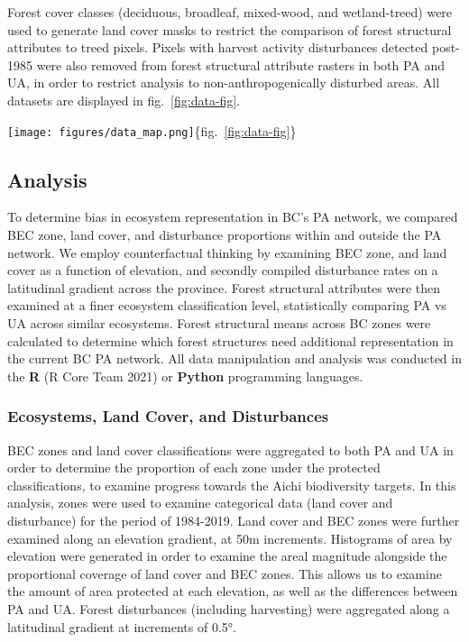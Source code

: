 \documentclass[11pt]{article}
\begin{document}
Forest cover classes (deciduous, broadleaf, mixed-wood, and
wetland-treed) were used to generate land cover masks to restrict the
comparison of forest structural attributes to treed pixels. Pixels with
harvest activity disturbances detected post-1985 were also removed from
forest structural attribute rasters in both PA and UA, in order to
restrict analysis to non-anthropogenically disturbed areas. All datasets
are displayed in fig.~\ref{fig:data-fig}.

\texttt{[image: figures/data\_map.png]}\{fig.~\ref{fig:data-fig}\}

\hypertarget{analysis}{%
\subsection{Analysis}\label{analysis}}

To determine bias in ecosystem representation in BC's PA network, we
compared BEC zone, land cover, and disturbance proportions within and
outside the PA network. We employ counterfactual thinking by examining
BEC zone, and land cover as a function of elevation, and secondly
compiled disturbance rates on a latitudinal gradient across the
province. Forest structural attributes were then examined at a finer
ecosystem classification level, statistically comparing PA vs UA across
similar ecosystems. Forest structural means across BC zones were
calculated to determine which forest structures need additional
representation in the current BC PA network. All data manipulation and
analysis was conducted in the \textbf{R} (R Core Team 2021) or
\textbf{Python} programming languages.

\hypertarget{ecosystems-land-cover-and-disturbances}{%
\subsubsection{Ecosystems, Land Cover, and
Disturbances}\label{ecosystems-land-cover-and-disturbances}}

BEC zones and land cover classifications were aggregated to both PA and
UA in order to determine the proportion of each zone under the protected
classifications, to examine progress towards the Aichi biodiversity
targets. In this analysis, zones were used to examine categorical data
(land cover and disturbance) for the period of 1984-2019. Land cover and
BEC zones were further examined along an elevation gradient, at 50m
increments. Histograms of area by elevation were generated in order to
examine the areal magnitude alongside the proportional coverage of land
cover and BEC zones. This allows us to examine the amount of area
protected at each elevation, as well as the differences between PA and
UA. Forest disturbances (including harvesting) were aggregated along a
latitudinal gradient at increments of 0.5°.
\end{document}
